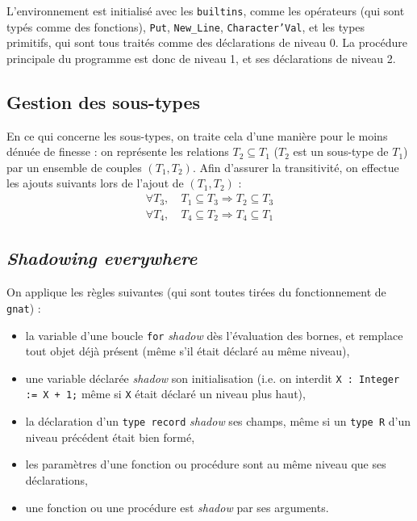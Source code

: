 \documentclass[a4paper, 10pt, french]{article}
\newcommand{\codeAda}[1]{\texttt{#1}}
\newcommand{\code}[1]{\texttt{#1}}
\begin{document}
L'environnement est initialisé avec les \code{builtins}, comme les opérateurs (qui sont typés comme des fonctions), \codeAda{Put}, \codeAda{New_Line}, \codeAda{Character'Val}, et les types primitifs, qui sont tous traités comme des déclarations de niveau 0. La procédure principale du programme est donc de niveau 1, et ses déclarations de niveau 2.

\subsection{Gestion des sous-types}

En ce qui concerne les sous-types, on traite cela d'une manière pour le moins dénuée de finesse : on représente les relations $T_2 \subseteq T_1$ ($T_2$ est un sous-type de $T_1$) par un ensemble de couples $(T_1, T_2)$. Afin d'assurer la transitivité, on effectue les ajouts suivants lors de l'ajout de $(T_1, T_2)$ :
\begin{align*}
 \forall T_3,&\ T_1 \subseteq T_3 \Rightarrow T_2 \subseteq T_3 \\
 \forall T_4,&\ T_4 \subseteq T_2 \Rightarrow T_4 \subseteq T_1
\end{align*}

\subsection{\emph{Shadowing everywhere}}

On applique les règles suivantes (qui sont toutes tirées du fonctionnement de \code{gnat}) :
\begin{itemize}
  \item la variable d'une boucle \codeAda{for} \emph{shadow} dès l'évaluation des bornes, et remplace tout objet déjà présent (même s'il était déclaré au même niveau),
  \item une variable déclarée \emph{shadow} son initialisation (i.e. on interdit \codeAda{X : Integer := X + 1;} même si \codeAda{X} était déclaré un niveau plus haut),
  \item la déclaration d'un \codeAda{type record} \emph{shadow} ses champs, même si un \codeAda{type R} d'un niveau précédent était bien formé,
  \item les paramètres d'une fonction ou procédure sont au même niveau que ses déclarations,
  \item une fonction ou une procédure est \emph{shadow} par ses arguments.
\end{itemize}
\end{document}
